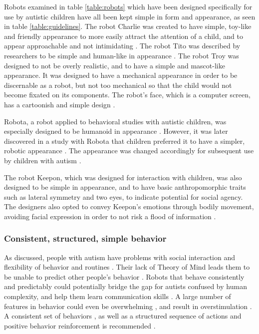Robots examined in table \ref{table:robots} which have been designed specifically for use by autistic children have all been kept simple in form and appearance, as seen in table \ref{table:guidelines}. The robot Charlie was created to have simple, toy-like and friendly appearance to more easily attract the attention of a child, and to appear approachable and not intimidating \cite{charlie2011, boccanfuso2017low}. The robot Tito was described by researchers to be simple and human-like in appearance \cite{duquette2008exploring}. The robot Troy was designed to not be overly realistic, and to have a simple and mascot-like appearance. It was designed to have a mechanical appearance in order to be discernable as a robot, but not too mechanical so that the child would not become fixated on its components. The robot's face, which is a computer screen, has a cartoonish and simple design \cite{giullian2010detailed}.

Robota, a robot applied to behavioral studies with autistic children, was especially designed to be humanoid in appearance \cite{billard2006building}. However, it was later discovered in a study with Robota that children preferred it to have a simpler, robotic appearance \cite{robins2006appearance}. The appearance was changed accordingly for subsequent use by children with autism \cite{billard2006building}.

The robot Keepon, which was designed for interaction with children, was also designed to be simple in appearance, and to have basic anthropomorphic traits such as lateral symmetry and two eyes, to indicate potential for social agency. The designers also opted to convey Keepon's emotions through bodily movement, avoiding facial expression in order to not risk a flood of information \cite{kozima2009keepon}.


\subsubsection{Consistent, structured, simple behavior}

As discussed, people with autism have problems with social interaction and flexibility of behavior and routines \cite{frith2003autism, tetzchner}. Their lack of Theory of Mind leads them to be unable to predict other people's behavior \cite{baron1985does, frith2003autism}. Robots that behave consistently and predictably could potentially bridge the gap for autists confused by human complexity, and help them learn communication skills \cite{designSpaces, robins2007eliciting}. A large number of features in behavior could even be overwhelming \cite{designSpaces}, and result in overstimulation \cite{designSpaces, kozima2009keepon}. A consistent set of behaviors \cite{bartneck2004design}, as well as a structured sequence of actions and positive behavior reinforcement is recommended \cite{robins2007eliciting}.

